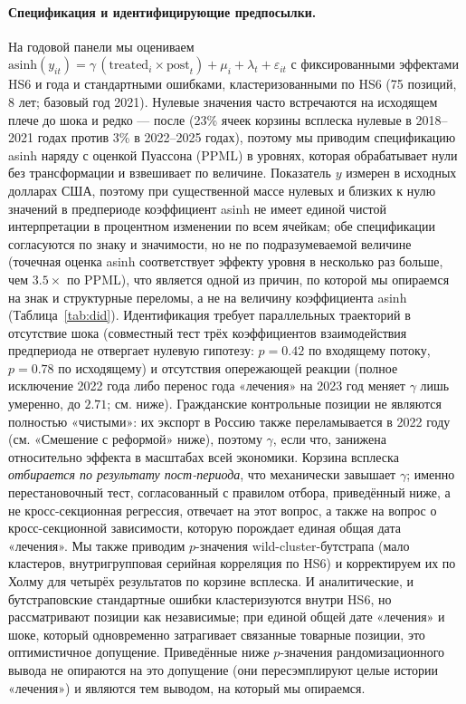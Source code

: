 \documentclass[12pt]{article}
\begin{document}
\paragraph{Спецификация и идентифицирующие предпосылки.} На годовой панели мы оцениваем
$\text{asinh}(y_{it}) = \gamma\,(\text{treated}_i \times \text{post}_t) + \mu_i + \lambda_t +
\varepsilon_{it}$ с фиксированными эффектами HS6 и года и стандартными ошибками,
кластеризованными по HS6 (75 позиций, 8 лет; базовый год 2021). Нулевые значения часто
встречаются на исходящем плече до шока и редко — после (23\% ячеек корзины всплеска нулевые
в 2018--2021 годах против 3\% в 2022--2025 годах), поэтому мы приводим спецификацию asinh
наряду с оценкой Пуассона (PPML) в уровнях, которая обрабатывает нули без трансформации и
взвешивает по величине. Показатель $y$ измерен в исходных долларах США, поэтому при
существенной массе нулевых и близких к нулю значений в предпериоде коэффициент asinh не
имеет единой чистой интерпретации в процентном изменении по всем ячейкам; обе спецификации
согласуются по знаку и значимости, но не по подразумеваемой величине (точечная оценка asinh
соответствует эффекту уровня в несколько раз больше, чем $3.5\times$ по PPML), что является
одной из причин, по которой мы опираемся на знак и структурные переломы, а не на величину
коэффициента asinh (Таблица~\ref{tab:did}). Идентификация требует параллельных траекторий в
отсутствие шока (совместный тест трёх коэффициентов взаимодействия предпериода не отвергает
нулевую гипотезу: $p = 0.42$ по входящему потоку, $p = 0.78$ по исходящему) и отсутствия
опережающей реакции (полное исключение 2022 года либо перенос года «лечения» на 2023 год
меняет $\gamma$ лишь умеренно, до $2.71$; см. ниже). Гражданские контрольные позиции не
являются полностью «чистыми»: их экспорт в Россию также переламывается в 2022 году (см.
«Смешение с реформой» ниже), поэтому $\gamma$, если что, занижена относительно эффекта в
масштабах всей экономики. Корзина всплеска \emph{отбирается по результату пост-периода}, что
механически завышает $\gamma$; именно перестановочный тест, согласованный с правилом
отбора, приведённый ниже, а не кросс-секционная регрессия, отвечает на этот вопрос, а также
на вопрос о кросс-секционной зависимости, которую порождает единая общая дата «лечения». Мы
также приводим $p$-значения wild-cluster-бутстрапа (мало кластеров, внутригрупповая
серийная корреляция по HS6) и корректируем их по Холму для четырёх результатов по корзине
всплеска. И аналитические, и бутстраповские стандартные ошибки кластеризуются внутри HS6, но
рассматривают позиции как независимые; при единой общей дате «лечения» и шоке, который
одновременно затрагивает связанные товарные позиции, это оптимистичное допущение.
Приведённые ниже $p$-значения рандомизационного вывода не опираются на это допущение (они
пересэмплируют целые истории «лечения») и являются тем выводом, на который мы опираемся.
\end{document}
